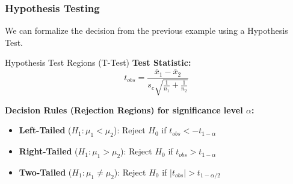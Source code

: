 \subsubsection{Hypothesis Testing}

We can formalize the decision from the previous example using a Hypothesis Test.

\begin{defbox}{Hypothesis Test Regions (T-Test)}
\textbf{Test Statistic:} 
\begin{equation}
t_{obs} = \frac{\overline{x}_{1}-\overline{x}_{2}}{s_{c}\sqrt{\frac{1}{n_{1}}+\frac{1}{n_{2}}}}
\end{equation}

\textbf{Decision Rules (Rejection Regions) for significance level $\alpha$:}
\begin{itemize}
    \item \textbf{Left-Tailed} ($H_1: \mu_1 < \mu_2$): Reject $H_0$ if $t_{obs} < -t_{1-\alpha}$
    \item \textbf{Right-Tailed} ($H_1: \mu_1 > \mu_2$): Reject $H_0$ if $t_{obs} > t_{1-\alpha}$
    \item \textbf{Two-Tailed} ($H_1: \mu_1 \neq \mu_2$): Reject $H_0$ if $|t_{obs}| > t_{1-\alpha/2}$
\end{itemize}
\end{defbox}

